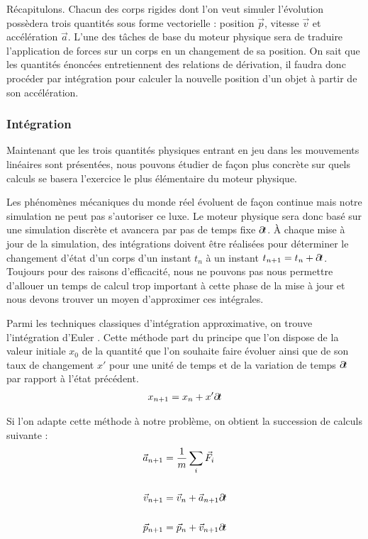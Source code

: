 Récapitulons. Chacun des corps rigides dont l'on veut simuler
l'évolution possèdera trois quantités sous forme vectorielle :
position $\vec p$, vitesse $\vec v$ et accélération $\vec a$. L'une
des tâches de base du moteur physique sera de traduire l'application
de forces sur un corps en un changement de sa position. On sait que
les quantités énoncées entretiennent des relations de dérivation, il
faudra donc procéder par intégration pour calculer la nouvelle
position d'un objet à partir de son accélération.

\subsubsection{Intégration}

Maintenant que les trois quantités physiques entrant en jeu dans les
mouvements linéaires sont présentées, nous pouvons étudier de façon
plus concrète sur quels calculs se basera l'exercice le plus
élémentaire du moteur physique.

Les phénomènes mécaniques du monde réel évoluent de façon continue
mais notre simulation ne peut pas s'autoriser ce luxe. Le moteur
physique sera donc basé sur une simulation discrète et avancera par pas
de temps fixe $\partial \! t$. \`A chaque mise à jour de la simulation, des
intégrations doivent être réalisées pour déterminer le changement
d'état d'un corps d'un instant $t_n$ à un instant $t_{n+1} = t_n +
\partial \! t$. Toujours pour des raisons d'efficacité, nous ne pouvons pas
nous permettre d'allouer un temps de calcul trop important à cette
phase de la mise à jour et nous devons trouver un moyen d'approximer
ces intégrales.

Parmi les techniques classiques d'intégration approximative, on trouve
l'intégration d'Euler \cite{hecker}. Cette méthode part du principe
que l'on dispose de la valeur initiale $x_0$ de la quantité que l'on
souhaite faire évoluer ainsi que de son taux de changement $x'$ pour
une unité de temps et de la variation de temps $\partial \! t$ par rapport
à l'état précédent.
\begin{align*}
  x_{n+1} = x_{n} + x' \partial \! t
\end{align*}

Si l'on adapte cette méthode à notre problème, on obtient la
succession de calculs suivante :
\begin{align*}
  \vec{a}_{n+1} &= \frac{1}{m} \sum_i \vec{F}_i \\ \\
  \vec{v}_{n+1} &= \vec{v}_n + \vec{a}_{n+1} \partial \! t \\ \\
  \vec{p}_{n+1} &= \vec{p}_n + \vec{v}_{n+1} \partial \! t
\end{align*}

